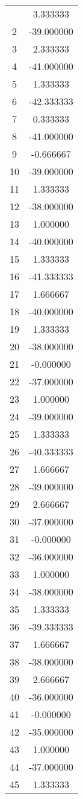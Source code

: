 \documentclass[12pt]{article}
\begin{document}
\begin{longtable}{@{}cc@{}}
\bottomrule
\endlastfoot
1 & 3.333333 \\
2 & -39.000000 \\
3 & 2.333333 \\
4 & -41.000000 \\
5 & 1.333333 \\
6 & -42.333333 \\
7 & 0.333333 \\
8 & -41.000000 \\
9 & -0.666667 \\
10 & -39.000000 \\
11 & 1.333333 \\
12 & -38.000000 \\
13 & 1.000000 \\
14 & -40.000000 \\
15 & 1.333333 \\
16 & -41.333333 \\
17 & 1.666667 \\
18 & -40.000000 \\
19 & 1.333333 \\
20 & -38.000000 \\
21 & -0.000000 \\
22 & -37.000000 \\
23 & 1.000000 \\
24 & -39.000000 \\
25 & 1.333333 \\
26 & -40.333333 \\
27 & 1.666667 \\
28 & -39.000000 \\
29 & 2.666667 \\
30 & -37.000000 \\
31 & -0.000000 \\
32 & -36.000000 \\
33 & 1.000000 \\
34 & -38.000000 \\
35 & 1.333333 \\
36 & -39.333333 \\
37 & 1.666667 \\
38 & -38.000000 \\
39 & 2.666667 \\
40 & -36.000000 \\
41 & -0.000000 \\
42 & -35.000000 \\
43 & 1.000000 \\
44 & -37.000000 \\
45 & 1.333333 \\

\end{longtable}
\end{document}
